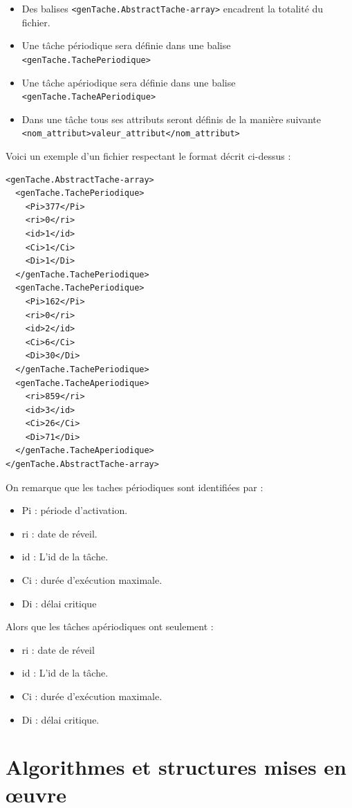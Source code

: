 \begin{itemize}
\item
Des balises \verb+<genTache.AbstractTache-array>+ encadrent la totalité du fichier.
\item
Une tâche périodique sera définie dans une balise  \verb+<genTache.TachePeriodique>+ 
\item
Une tâche apériodique sera définie dans une balise  \verb+<genTache.TacheAPeriodique>+ 
\item
Dans une tâche tous ses attributs seront définis de la manière suivante \verb+<nom_attribut>valeur_attribut</nom_attribut>+
\end{itemize}

Voici un exemple d'un fichier respectant le format décrit ci-dessus : 

\begin{lstlisting}
<genTache.AbstractTache-array>
  <genTache.TachePeriodique>
    <Pi>377</Pi>
    <ri>0</ri>
    <id>1</id>
    <Ci>1</Ci>
    <Di>1</Di>
  </genTache.TachePeriodique>
  <genTache.TachePeriodique>
    <Pi>162</Pi>
    <ri>0</ri>
    <id>2</id>
    <Ci>6</Ci>
    <Di>30</Di>
  </genTache.TachePeriodique>
  <genTache.TacheAperiodique>
    <ri>859</ri>
    <id>3</id>
    <Ci>26</Ci>
    <Di>71</Di>
  </genTache.TacheAperiodique>
</genTache.AbstractTache-array>
\end{lstlisting}
On remarque que les taches périodiques sont identifiées par : 
\begin{itemize}
\item
Pi : période d'activation.
\item
ri : date de réveil.
\item
id : L'id de la tâche.
\item
Ci : durée d'exécution maximale.
\item
Di  : délai critique
\end{itemize} 
Alors que les tâches apériodiques ont seulement : 
\begin{itemize}
\item
ri  : date de réveil
\item
id : L'id de la tâche.
\item
Ci : durée d'exécution maximale.
\item
Di : délai critique.
\end{itemize} 



\section[Algorithmes]{Algorithmes et structures mises en œuvre%
}


